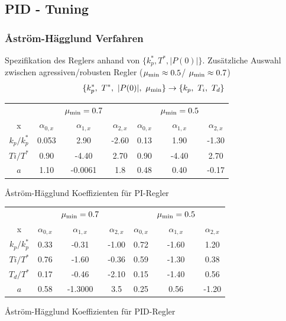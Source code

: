 
\subsection{PID - Tuning}
    \subsubsection{\r{A}ström-Hägglund Verfahren}
        Spezifikation des Reglers anhand von $\{k_p^*, T^*, |P(0)|\}$. Zusätzliche Auswahl zwischen agressiven/robusten Regler ($\mu_{\textnormal{min}} \approx 0.5$/ $\mu_{\textnormal{min}} \approx 0.7$)
        \[\{k_p^*,\ T^*,\ |P(0)|,\ \mu_{\textnormal{min}}\} \rightarrow \{k_p,\ T_i,\ T_d\}\]
            \begin{center}
            \begin{tabular}{c|c c c|c c c}
                & & $\mu_{\textnormal{min}} = 0.7$ & & &  $\mu_{\textnormal{min}} = 0.5$ & \\ 
                x & $\alpha_{0,x}$ & $\alpha_{1,x}$ & $\alpha_{2,x}$ & $\alpha_{0,x}$ & $\alpha_{1,x}$ & $\alpha_{2,x}$ \\ \hline
                $k_p/k_p^*$  & 0.053 & 2.90 & -2.60 & 0.13 & 1.90 & -1.30 \\
                $Ti/T^*$ & 0.90 & -4.40 & 2.70 & 0.90 & -4.40 & 2.70\\ 
                $a$  &  1.10  &  -0.0061  &  1.8  &   0.48  &  0.40  &  -0.17\\
            \end{tabular}
            \r{A}ström-Hägglund Koeffizienten für PI-Regler

        
            \begin{tabular}{c|c c c|c c c}
                & & $\mu_{\textnormal{min}} = 0.7$ & & &  $\mu_{\textnormal{min}} = 0.5$ & \\ 
                x &
                $\alpha_{0,x}$ & $\alpha_{1,x}$ & $\alpha_{2,x}$ & $\alpha_{0,x}$ & $\alpha_{1,x}$ & $\alpha_{2,x}$ \\ \hline
                $k_p/k_p^*$  & 0.33 & -0.31 & -1.00 & 0.72 & -1.60 & 1.20 \\
                $Ti/T^*$ & 0.76 & -1.60 & -0.36 & 0.59 & -1.30 & 0.38 \\
                $T_d/T^*$ & 0.17 & -0.46 & -2.10 & 0.15 & -1.40 & 0.56\\
                $a$  &  0.58  &  -1.3000  &  3.5  &   0.25  &  0.56  &  -1.20\\
            \end{tabular}    
            \r{A}ström-Hägglund Koeffizienten für PID-Regler 
            
            \end{center}
            
